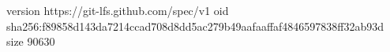 version https://git-lfs.github.com/spec/v1
oid sha256:f89858d143da7214ccad708d8dd5ac279b49aafaaffaf4846597838ff32ab93d
size 90630
